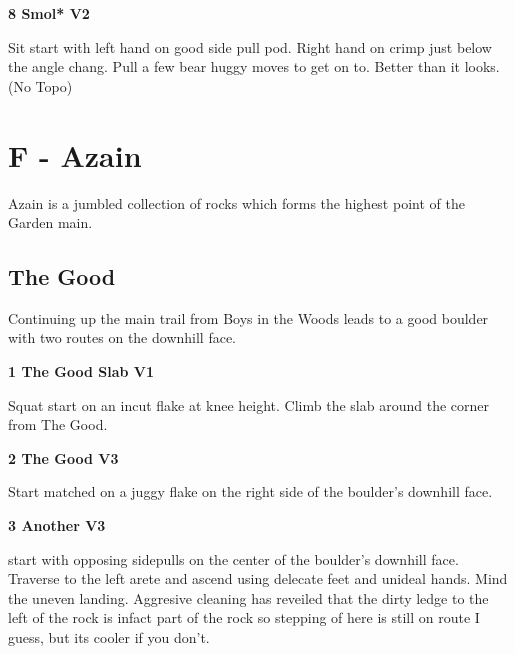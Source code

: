 \begin{multicols}{2}
			\label{rt:Smol}
\colorbox{green!20}{
\parbox{0.95\linewidth}{
\textbf{
8 Smol* V2  
}
}
}

			\begin{adjustwidth}{0.5cm}{}				
			Sit start with left hand on good side pull pod. Right hand on crimp just below the angle chang. Pull a few bear huggy moves to get on to. Better than it looks.
				\newline (No Topo) 
			\end{adjustwidth}
\newpage

		\section{F - Azain}\label{sa:Azain}
	Azain is a jumbled collection of rocks which forms the highest point of the Garden main.\\

	

		\subsection*{The Good}\label{bf:The Good}
		Continuing up the main trail from Boys in the Woods leads to a good boulder with two routes on the downhill face.\\
	
			\label{rt:The Good Slab}
\colorbox{green!20}{
\parbox{0.95\linewidth}{
\textbf{
1 The Good Slab V1  
}
}
}

			\begin{adjustwidth}{0.5cm}{}				
			Squat start on an incut flake at knee height. Climb the slab around the corner from The Good.
			\end{adjustwidth}
			\label{rt:The Good}
\colorbox{green!20}{
\parbox{0.95\linewidth}{
\textbf{
2 The Good V3  
}
}
}

			\begin{adjustwidth}{0.5cm}{}				
			Start matched on a juggy flake on the right side of the boulder's downhill face.
			\end{adjustwidth}
			\label{rt:Another}
\colorbox{green!20}{
\parbox{0.95\linewidth}{
\textbf{
3 Another V3  \warn
}
}
}

			\begin{adjustwidth}{0.5cm}{}				
			start with opposing sidepulls on the center of the boulder's downhill face. Traverse to the left arete and ascend using delecate feet and unideal hands. Mind the uneven landing. Aggresive cleaning has reveiled that the dirty ledge to the left of the rock is infact part of the rock so stepping of here is still on route I guess, but its cooler if you don't.
			\end{adjustwidth}

\end{multicols}
